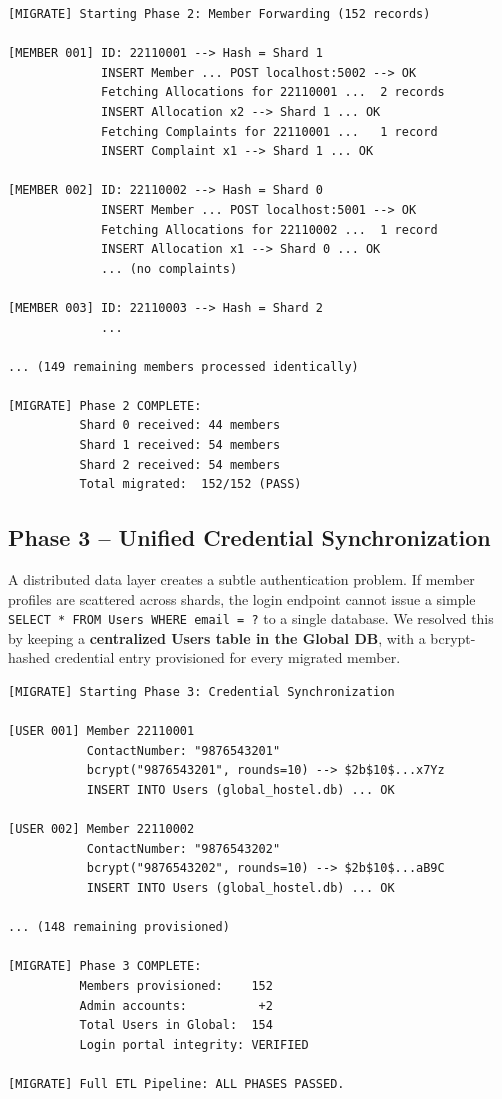 \documentclass[sigconf]{acmart}
\begin{document}
\begin{lstlisting}[style=logstyle, caption={ETL Phase 2: Member Migration and Relational Data Forwarding}]
[MIGRATE] Starting Phase 2: Member Forwarding (152 records)

[MEMBER 001] ID: 22110001 --> Hash = Shard 1
             INSERT Member ... POST localhost:5002 --> OK
             Fetching Allocations for 22110001 ...  2 records
             INSERT Allocation x2 --> Shard 1 ... OK
             Fetching Complaints for 22110001 ...   1 record
             INSERT Complaint x1 --> Shard 1 ... OK

[MEMBER 002] ID: 22110002 --> Hash = Shard 0
             INSERT Member ... POST localhost:5001 --> OK
             Fetching Allocations for 22110002 ...  1 record
             INSERT Allocation x1 --> Shard 0 ... OK
             ... (no complaints)

[MEMBER 003] ID: 22110003 --> Hash = Shard 2
             ...

... (149 remaining members processed identically)

[MIGRATE] Phase 2 COMPLETE:
          Shard 0 received: 44 members
          Shard 1 received: 54 members
          Shard 2 received: 54 members
          Total migrated:  152/152 (PASS)
\end{lstlisting}

\subsection{Phase 3 -- Unified Credential Synchronization}

A distributed data layer creates a subtle authentication problem. If member profiles are scattered across shards, the login endpoint cannot issue a simple \texttt{SELECT * FROM Users WHERE email = ?} to a single database. We resolved this by keeping a \textbf{centralized Users table in the Global DB}, with a bcrypt-hashed credential entry provisioned for every migrated member.

\begin{lstlisting}[style=logstyle, caption={ETL Phase 3: Unified User Credential Provisioning}]
[MIGRATE] Starting Phase 3: Credential Synchronization

[USER 001] Member 22110001
           ContactNumber: "9876543201"
           bcrypt("9876543201", rounds=10) --> $2b$10$...x7Yz
           INSERT INTO Users (global_hostel.db) ... OK

[USER 002] Member 22110002
           ContactNumber: "9876543202"
           bcrypt("9876543202", rounds=10) --> $2b$10$...aB9C
           INSERT INTO Users (global_hostel.db) ... OK

... (148 remaining provisioned)

[MIGRATE] Phase 3 COMPLETE:
          Members provisioned:    152
          Admin accounts:          +2
          Total Users in Global:  154
          Login portal integrity: VERIFIED

[MIGRATE] Full ETL Pipeline: ALL PHASES PASSED.
\end{lstlisting}
\end{document}
